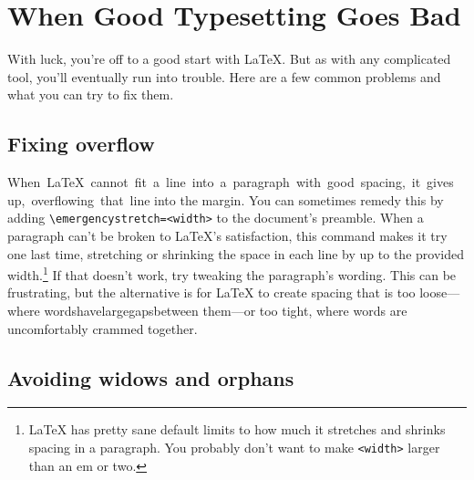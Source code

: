 \chapter{When Good Typesetting Goes Bad}

With luck, you're off to a good start with \LaTeX.
But as with any complicated tool, you'll eventually run into trouble.
Here are a few common problems and what you can try to fix them.

\section{Fixing overflow}

\mbox{When \LaTeX{} cannot fit a line into a paragraph with good spacing,
it gives up, overflowing that line}
into the margin.
You can sometimes remedy this by adding
\verb|\emergencystretch=<width>| to the document's preamble.
When a paragraph can't be broken to \LaTeX's satisfaction,
this command makes it try one last time,
stretching or shrinking the space in each line by up to the provided
width.\punckern\footnote{\LaTeX{} has pretty sane default limits to how much
it stretches and shrinks spacing in a paragraph.
You probably don't want to make \texttt{<width>} larger than an em or two.}
If that doesn't work, try tweaking the paragraph's wording.
This can be frustrating, but the alternative is for \LaTeX{} to create spacing
that is too loose---where\enspace
words\enspace have\enspace large\quad gaps\quad between\enspace
them---or too tight, where\! words\! are\! uncomfortably\! crammed\! together.

\section{Avoiding widows and orphans}

